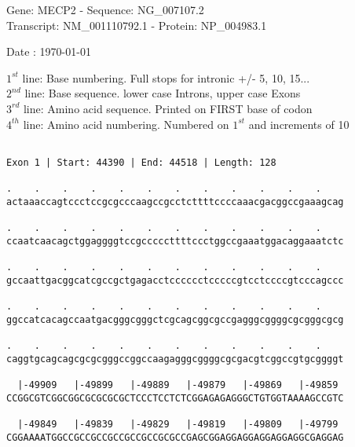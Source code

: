 \documentclass{article}
\begin{document}
\begin{center}
\begin{large}
Gene: MECP2 - Sequence: NG\_007107.2\\
Transcript: NM\_001110792.1 - Protein: NP\_004983.1
 
 Date : \today
\end{large}
\end{center}
$1^{st}$ line: Base numbering. Full stops for intronic +/- 5, 10, 15...\\
$2^{nd}$ line: Base sequence. lower case Introns, upper case Exons\\
$3^{rd}$ line: Amino acid sequence. Printed on FIRST base of codon\\
$4^{th}$ line: Amino acid numbering. Numbered on $1^{st}$ and increments of 10\\
 \begin{Verbatim}
 
Exon 1 | Start: 44390 | End: 44518 | Length: 128
 
.    .    .    .    .    .    .    .    .    .    .    .    
actaaaccagtccctccgcgcccaagccgcctcttttccccaaacgacggccgaaagcag
                                                            
.    .    .    .    .    .    .    .    .    .    .    .    
ccaatcaacagctggaggggtccgcccccttttccctggccgaaatggacaggaaatctc
                                                            
.    .    .    .    .    .    .    .    .    .    .    .    
gccaattgacggcatcgccgctgagacctcccccctcccccgtcctccccgtcccagccc
                                                            
.    .    .    .    .    .    .    .    .    .    .    .    
ggccatcacagccaatgacgggcgggctcgcagcggcgccgagggcggggcgcgggcgcg
                                                            
.    .    .    .    .    .    .    .    .    .    .    .    
caggtgcagcagcgcgcgggccggccaagagggcggggcgcgacgtcggccgtgcggggt
                                                            
  |-49909   |-49899   |-49889   |-49879   |-49869   |-49859 
CCGGCGTCGGCGGCGCGCGCGCTCCCTCCTCTCGGAGAGAGGGCTGTGGTAAAAGCCGTC
                                                            
  |-49849   |-49839   |-49829   |-49819   |-49809   |-49799 
CGGAAAATGGCCGCCGCCGCCGCCGCCGCGCCGAGCGGAGGAGGAGGAGGAGGCGAGGAG
                                                            

\end{Verbatim}
\end{document}
